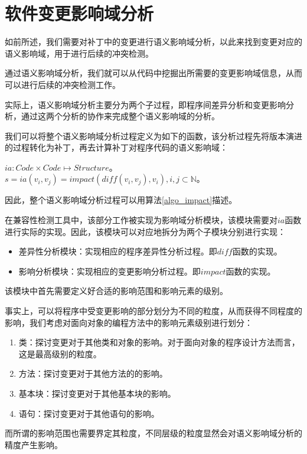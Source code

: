 \chapter{软件变更影响域分析}
\label{chap_impact}
如前所述，我们需要对补丁中的变更进行语义影响域分析，以此来找到变更对应的语义影响域，用于进行后续的冲突检测。

通过语义影响域分析，我们就可以从代码中挖掘出所需要的变更影响域信息，从而可以进行后续的冲突检测工作。

实际上，语义影响域分析主要分为两个子过程，即程序间差异分析和变更影响分析，通过这两个分析的协作来完成整个语义影响域的分析。

我们可以将整个语义影响域分析过程定义为如下的函数，该分析过程先将版本演进的过程转化为补丁，再去计算补丁对程序代码的语义影响域：

\begin{definition}
	$ia: Code \times Code \mapsto {Structure}$。$s = ia(v_i,v_j) = impact(diff(v_i,v_j),v_i),i,j \subset \mathbb{N}$。
\end{definition}

因此，整个语义影响域分析过程可以用算法\ref {algo_impact}描述。

在兼容性检测工具中，该部分工作被实现为影响域分析模块，该模块需要对$ia$函数进行实际的实现。因此，该模块可以对应地拆分为两个子模块分别进行实现：
\begin{itemize}
	\item 差异性分析模块：实现相应的程序差异性分析过程。即$diff$函数的实现。
	\item 影响分析模块：实现相应的变更影响分析过程。即$impact$函数的实现。
\end{itemize}

该模块中首先需要定义好合适的影响范围和影响元素的级别。

事实上，可以将程序中受变更影响的部分划分为不同的粒度，从而获得不同程度的影响\cite{petrenko2009variable}，我们考虑对面向对象的编程方法中的影响元素级别进行划分：

\begin{enumerate}
	\item 类：探讨变更对于其他类和对象的影响。对于面向对象的程序设计方法而言，这是最高级别的粒度。
	\item 方法：探讨变更对于其他方法的的影响。
	\item 基本块：探讨变更对于其他基本块的影响。
	\item 语句：探讨变更对于其他语句的影响。
\end{enumerate}

而所谓的影响范围也需要界定其粒度，不同层级的粒度显然会对语义影响域分析的精度产生影响。

